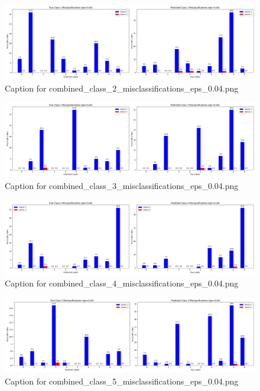\documentclass[11pt,onside]{article}
\begin{document}
\begin{figure}[ht]
\centering
\includegraphics[width=1\textwidth]{combined_class_boundary_pgd/combined_class_2_misclassifications_eps_0.04.png}
\caption{Caption for combined_class_2_misclassifications_eps_0.04.png}
\label{fig:combined_class_2_misclassifications_eps_0.04.png}
\end{figure}




\begin{figure}[ht]
\centering
\includegraphics[width=1\textwidth]{combined_class_boundary_pgd/combined_class_3_misclassifications_eps_0.04.png}
\caption{Caption for combined_class_3_misclassifications_eps_0.04.png}
\label{fig:combined_class_3_misclassifications_eps_0.04.png}
\end{figure}

\begin{figure}[ht]
\centering
\includegraphics[width=1\textwidth]{combined_class_boundary_pgd/combined_class_4_misclassifications_eps_0.04.png}
\caption{Caption for combined_class_4_misclassifications_eps_0.04.png}
\label{fig:combined_class_4_misclassifications_eps_0.04.png}
\end{figure}

\begin{figure}[ht]
\centering
\includegraphics[width=1\textwidth]{combined_class_boundary_pgd/combined_class_5_misclassifications_eps_0.04.png}
\caption{Caption for combined_class_5_misclassifications_eps_0.04.png}
\label{fig:combined_class_5_misclassifications_eps_0.04.png}
\end{figure}
\end{document}
